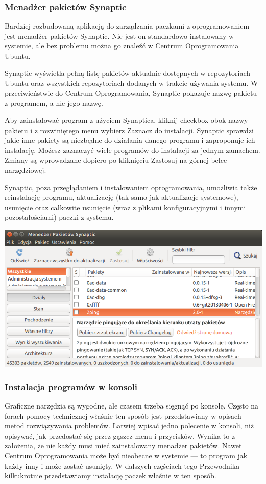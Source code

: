 \subsubsection{Menadżer pakietów Synaptic}
Bardziej rozbudowaną aplikacją do zarządzania paczkami z oprogramowaniem jest menadżer pakietów \textcolor{ubuntu_orange}{Synaptic}. Nie jest on standardowo instalowany w systemie, ale bez problemu można go znaleźć w Centrum Oprogramowania Ubuntu.

Synaptic wyświetla pełną listę pakietów aktualnie dostępnych w repozytoriach Ubuntu oraz wszystkich repozytoriach dodanych w trakcie używania systemu. W przeciwieństwie do Centrum Oprogramowania, Synaptic pokazuje nazwę pakietu z programem, a nie jego nazwę.

Aby zainstalować program z użyciem Synaptica, kliknij checkbox obok nazwy pakietu i z rozwiniętego menu wybierz \textcolor{ubuntu_orange}{Zaznacz do instalacji}. Synaptic sprawdzi jakie inne pakiety są niezbędne do działania danego programu i zaproponuje ich instalację. Możesz zaznaczyć wiele programów do instalacji za jednym zamachem. Zmiany są wprowadzane dopiero po kliknięciu \textcolor{ubuntu_orange}{Zastosuj} na górnej belce narzędziowej.

Synaptic, poza przeglądaniem i instalowaniem oprogramowania, umożliwia także reinstalację programu, aktualizację (tak samo jak aktualizacje systemowe), usunięcie oraz całkowite usunięcie (wraz z plikami konfiguracyjnymi i innymi pozostałościami) paczki z systemu.

\begin{center}
	\includegraphics[width=\linewidth]{images/programy_synaptic.png}
\end{center}

\subsubsection{Instalacja programów w konsoli}
Graficzne narzędzia są wygodne, ale czasem trzeba sięgnąć po konsolę. Często na forach pomocy technicznej właśnie ten sposób jest przedstawiany w opisach metod rozwiązywania problemów. Łatwiej wpisać jedno polecenie w konsoli, niż opisywać, jak przedostać się przez gąszcz menu i przycisków. Wynika to z założenia, że nie każdy musi mieć zainstalowany menadżer pakietów. Nawet Centrum Oprogramowania może być nieobecne w systemie --- to program jak każdy inny i może zostać usunięty.
W dalszych częściach tego Przewodnika kilkukrotnie przedstawiamy instalację paczek właśnie w ten sposób.

